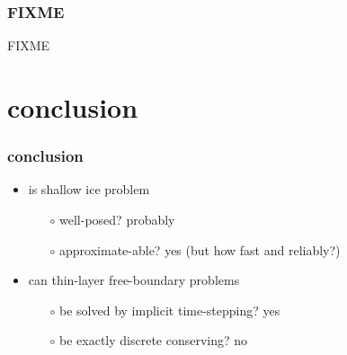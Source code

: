 \documentclass[hide notes,intlimits]{beamer}
\begin{document}
\begin{frame}
  \frametitle{FIXME} 

FIXME
\end{frame}


\section*{conclusion}

\begin{frame}
  \frametitle{conclusion}

\begin{itemize}
\item is shallow ice problem
  \begin{itemize}
  \item[$\circ$] well-posed? \qquad \alert{probably}
  \item[$\circ$] approximate-able? \qquad \alert{yes} (but how fast and reliably?)
  \end{itemize}
\item can thin-layer free-boundary problems
  \begin{itemize}
  \item[$\circ$] be solved by implicit time-stepping? \qquad \alert{yes}
  \item[$\circ$] be exactly discrete conserving? \qquad \alert{no}
  \end{itemize}
\end{itemize}
\end{frame}
\end{document}
